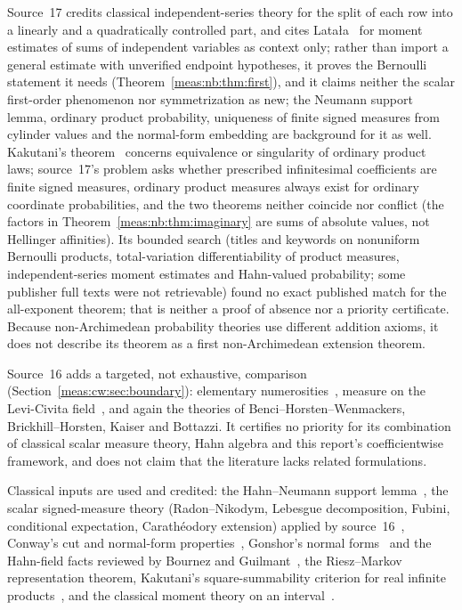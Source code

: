 \documentclass[11pt]{article}
\numberwithin{equation}{section}
\theoremstyle{definition}
\theoremstyle{remark}
\begin{document}
Source~17 credits classical independent-series theory for the split of each row
into a linearly and a quadratically controlled part, and cites
Lata\l a~\cite{Latala} for moment estimates of sums of independent variables as
context only; rather than import a general estimate with unverified endpoint
hypotheses, it proves the Bernoulli statement it needs
(Theorem~\ref{meas:nb:thm:first}), and it claims neither the scalar first-order
phenomenon nor symmetrization as new; the Neumann support lemma, ordinary product
probability, uniqueness of finite signed measures from cylinder values and the
normal-form embedding are background for it as well. Kakutani's theorem~\cite{Kakutani} concerns
equivalence or singularity of ordinary product laws; source~17's problem asks
whether prescribed infinitesimal coefficients are finite signed measures, ordinary
product measures always exist for ordinary coordinate probabilities, and the two
theorems neither coincide nor conflict (the factors in
Theorem~\ref{meas:nb:thm:imaginary} are sums of absolute values, not Hellinger
affinities). Its bounded search (titles and keywords on nonuniform Bernoulli
products, total-variation differentiability of product measures,
independent-series moment estimates and Hahn-valued probability; some publisher
full texts were not retrievable) found no exact published match for the
all-exponent theorem; that is neither a proof of absence nor a priority
certificate. Because non-Archimedean probability theories use different addition
axioms, it does not describe its theorem as a first non-Archimedean extension
theorem.

Source~16 adds a targeted, not exhaustive, comparison
(Section~\ref{meas:cw:sec:boundary}): elementary numerosities~\cite{BBDN},
measure on the Levi-Civita field~\cite{LeviCivita}, and again the theories of
Benci--Horsten--Wenmackers, Brickhill--Horsten, Kaiser and Bottazzi. It certifies
no priority for its combination of classical scalar measure theory, Hahn algebra
and this report's coefficientwise framework, and does not claim that the
literature lacks related formulations.

Classical inputs are used and credited: the Hahn--Neumann support
lemma~\cite{Neumann}, the scalar signed-measure theory (Radon--Nikodym,
Lebesgue decomposition, Fubini, conditional expectation, Carath\'eodory
extension) applied by source~16~\cite{Bogachev}, Conway's cut and normal-form
properties~\cite{Conway}, Gonshor's normal forms~\cite{Gonshor} and the Hahn-field
facts reviewed by Bournez and Guilmant~\cite{BG}, the Riesz--Markov
representation theorem, Kakutani's square-summability criterion for real
infinite products~\cite{Kakutani}, and the classical moment theory on an
interval~\cite{Schmudgen}.
\end{document}
